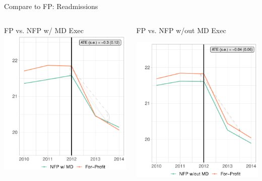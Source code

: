 \documentclass[notes,11pt, aspectratio=169]{beamer}
\begin{document}
\begin{frame}{Compare to FP: Readmissions}
\begin{columns}
    \begin{column}{0.5\textwidth}
        \centering
        FP vs. NFP w/ MD Exec\\\vspace{2mm}
        \includegraphics[width=.75\textwidth]{Objects/read_fp_md_synth_graph.pdf}
    \end{column}
        \begin{column}{0.5\textwidth}
        \centering
        FP vs. NFP w/out MD Exec

        \vspace{2mm}
        \includegraphics[width=.75\textwidth]{Objects/read_fp_nomd_synth_graph.pdf}
    \end{column}
\end{columns}
\end{frame}
\end{document}
